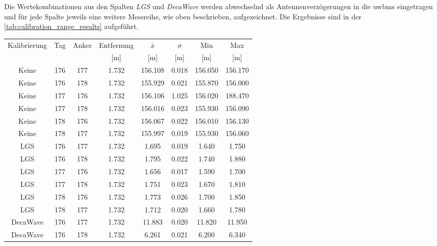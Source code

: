 Die Wertekombinationen aus den Spalten \textit{LGS} und \textit{DecaWave} werden abwechselnd als Antennenverzögerungen in die \Glspl{uwbm} eingetragen und für jede Spalte jeweils eine weitere Messreihe, wie oben beschrieben, aufgezeichnet. Die Ergebnisse sind in der \autoref{tab:calibration_range_results}\footnotemark{} aufgeführt.

\begin{table}
	\centering
	\begin{tabular}{||c||cc||ccc|cc||}
\hline
Kalibrierung & Tag & Anker & Entfernung & $\overline{x}$ & $\sigma$ & Min & Max \\
 & & & [\si{\meter}] & [\si{\meter}] & [\si{\meter}] & [\si{\meter}] & [\si{\meter}] \\
\hline
\hline
Keine & 176 & 177 & \num{1.732} & \num{156.108} & \num{0.018} & \num{156.050} & \num{156.170} \\
Keine & 176 & 178 & \num{1.732} & \num{155.929} & \num{0.021} & \num{155.870} & \num{156.000} \\
Keine & 177 & 176 & \num{1.732} & \num{156.106} & \num{1.025} & \num{156.020} & \num{188.470} \\
Keine & 177 & 178 & \num{1.732} & \num{156.016} & \num{0.023} & \num{155.930} & \num{156.090} \\
Keine & 178 & 176 & \num{1.732} & \num{156.067} & \num{0.022} & \num{156.010} & \num{156.130} \\
Keine & 178 & 177 & \num{1.732} & \num{155.997} & \num{0.019} & \num{155.930} & \num{156.060} \\
\hline
LGS & 176 & 177 & \num{1.732} & \num{1.695} & \num{0.019} & \num{1.640} & \num{1.750} \\
LGS & 176 & 178 & \num{1.732} & \num{1.795} & \num{0.022} & \num{1.740} & \num{1.880} \\
LGS & 177 & 176 & \num{1.732} & \num{1.656} & \num{0.017} & \num{1.590} & \num{1.700} \\
LGS & 177 & 178 & \num{1.732} & \num{1.751} & \num{0.023} & \num{1.670} & \num{1.810} \\
LGS & 178 & 176 & \num{1.732} & \num{1.773} & \num{0.026} & \num{1.700} & \num{1.850} \\
LGS & 178 & 177 & \num{1.732} & \num{1.712} & \num{0.020} & \num{1.660} & \num{1.780} \\
\hline
DecaWave & 176 & 177 & \num{1.732} & \num{11.883} & \num{0.020} & \num{11.820} & \num{11.950} \\
DecaWave & 176 & 178 & \num{1.732} & \num{6.261} & \num{0.021} & \num{6.200} & \num{6.340} \\

\end{tabular}
\end{table}
